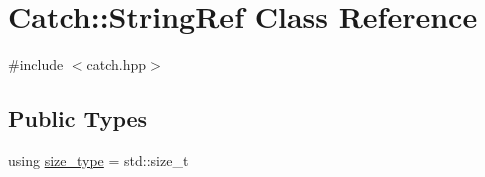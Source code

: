 \hypertarget{class_catch_1_1_string_ref}{}\section{Catch\+:\+:String\+Ref Class Reference}
\label{class_catch_1_1_string_ref}


{\ttfamily \#include $<$catch.\+hpp$>$}

\subsection*{Public Types}
\begin{DoxyCompactItemize}
\item 
using \mbox{\hyperlink{class_catch_1_1_string_ref_a06b4db8fc82b197004291cf370b2ba7c}{size\+\_\+type}} = std\+::size\+\_\+t
\end{DoxyCompactItemize}
